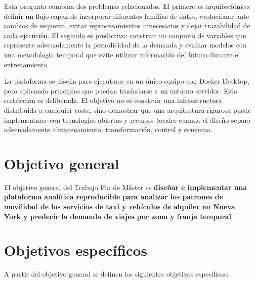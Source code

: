 Esta pregunta combina dos problemas relacionados. El primero es arquitectónico: definir un flujo capaz de incorporar diferentes familias de datos, evolucionar ante cambios de esquema, evitar reprocesamientos innecesarios y dejar trazabilidad de cada ejecución. El segundo es predictivo: construir un conjunto de variables que represente adecuadamente la periodicidad de la demanda y evaluar modelos con una metodología temporal que evite utilizar información del futuro durante el entrenamiento.

La plataforma se diseña para ejecutarse en un único equipo con Docker Desktop, pero aplicando principios que puedan trasladarse a un entorno servidor. Esta restricción es deliberada. El objetivo no es construir una infraestructura distribuida a cualquier coste, sino demostrar que una arquitectura rigurosa puede implementarse con tecnologías abiertas y recursos locales cuando el diseño separa adecuadamente almacenamiento, transformación, control y consumo.

\section{Objetivo general}

El objetivo general del Trabajo Fin de Máster es \textbf{diseñar e implementar una plataforma analítica reproducible para analizar los patrones de movilidad de los servicios de taxi y vehículos de alquiler en Nueva York y predecir la demanda de viajes por zona y franja temporal}.

\section{Objetivos específicos}

A partir del objetivo general se definen los siguientes objetivos específicos:

